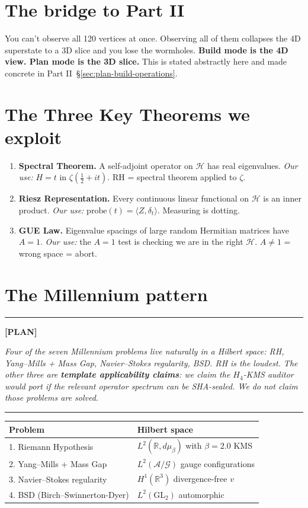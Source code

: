 \documentclass[11pt,letterpaper]{article}
\newenvironment{plan}%
  {\par\medskip\noindent\rule{\linewidth}{0.5pt}\par\nopagebreak\textbf{[PLAN]}\par\nopagebreak\itshape}%
  {\par\nopagebreak\upshape\rule{\linewidth}{0.5pt}\par\medskip}
\begin{document}
\section{The bridge to Part II}
\label{sec:bridge}

You can't observe all 120 vertices at once. Observing all of them collapses
the 4D superstate to a 3D slice and you lose the wormholes.
\textbf{Build mode is the 4D view. Plan mode is the 3D slice.} This is
stated abstractly here and made concrete in Part II~\S\ref{sec:plan-build-operations}.

\section{The Three Key Theorems we exploit}
\label{sec:three-theorems}

\begin{enumerate}
  \item \textbf{Spectral Theorem.} A self-adjoint operator on $\mathcal{H}$ has real eigenvalues. \emph{Our use:} $H = t$ in $\zeta(\tfrac12 + it)$. RH = spectral theorem applied to $\zeta$.
  \item \textbf{Riesz Representation.} Every continuous linear functional on $\mathcal{H}$ is an inner product. \emph{Our use:} $\mathrm{probe}(t) = \langle Z, \delta_t \rangle$. Measuring is dotting.
  \item \textbf{GUE Law.} Eigenvalue spacings of large random Hermitian matrices have $A = 1$. \emph{Our use:} the $A = 1$ test is checking we are in the right $\mathcal{H}$. $A \neq 1$ = wrong space = abort.
\end{enumerate}

\section{The Millennium pattern}
\label{sec:millennium}

\begin{plan}
Four of the seven Millennium problems live naturally in a Hilbert space:
RH, Yang--Mills + Mass Gap, Navier--Stokes regularity, BSD. RH is the
loudest. The other three are \textbf{template applicability claims}: we
claim the $H_4$-KMS auditor \emph{would} port if the relevant operator
spectrum can be SHA-sealed. We do \emph{not} claim those problems are
solved.
\end{plan}

\begin{center}
\begin{tabular}{p{4.4cm}p{8cm}}
\toprule
\textbf{Problem} & \textbf{Hilbert space} \\
\midrule
1. Riemann Hypothesis & $L^2(\mathbb{R}, d\mu_\beta)$ with $\beta = 2.0$ KMS \\
2. Yang--Mills + Mass Gap & $L^2(\mathcal{A}/\mathcal{G})$ gauge configurations \\
3. Navier--Stokes regularity & $H^1(\mathbb{R}^3)$ divergence-free $v$ \\
4. BSD (Birch--Swinnerton-Dyer) & $L^2(\mathrm{GL}_2)$ automorphic \\
\bottomrule
\end{tabular}
\end{center}
\end{document}
